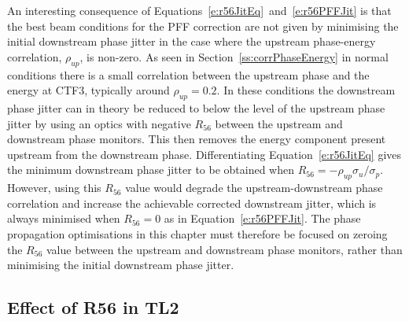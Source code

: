 An interesting consequence of Equations~\ref{e:r56JitEq}~and~\ref{e:r56PFFJit} is that the best beam conditions for the PFF correction are not given by minimising the initial downstream phase jitter in the case where the upstream phase-energy correlation, \(\rho_{up}\), is non-zero. As seen in Section~\ref{ss:corrPhaseEnergy} in normal conditions there is a small correlation between the upstream phase and the energy at CTF3, typically around \(\rho_{up}=0.2\). In these conditions the downstream phase jitter can in theory be reduced to below the level of the upstream phase jitter by using an optics with negative \(R_{56}\) between the upstream and downstream phase monitors. This then removes the energy component present upstream from the downstream phase. Differentiating Equation~\ref{e:r56JitEq} gives the minimum downstream phase jitter to be obtained when \(R_{56} = -\rho_{up}\sigma_u/\sigma_p\). However, using this \(R_{56}\) value would degrade the upstream-downstream phase correlation and increase the achievable corrected downstream jitter, which is always minimised when \(R_{56} = 0\) as in Equation~\ref{e:r56PFFJit}. The phase propagation optimisations in this chapter must therefore be focused on zeroing the \(R_{56}\) value between the upstream and downstream phase monitors, rather than minimising the initial downstream phase jitter. 

\subsection{Effect of R56 in TL2}
\label{ss:r56TL2Effect}


